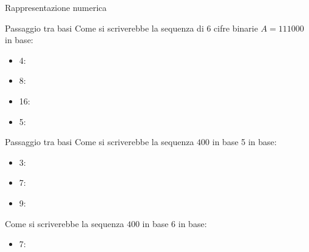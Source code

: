 \documentclass[11pt]{article}
\begin{document}
\begin{quiz}{Rappresentazione numerica}

\begin{cloze}[points=1,shuffle=false]{Passaggio tra basi}
Come si scriverebbe la sequenza di 6 cifre binarie $A = 111000$ in base:

\begin{itemize}
\item 4: 
\item 8: 
\item 16: 
\item 5: 
\end{itemize}
\end{cloze}

\begin{cloze}[points=1,shuffle=false]{Passaggio tra basi}
Come si scriverebbe la sequenza $400$ in base 5 in base:

\begin{itemize}
\item 3: 
\item 7: 
\item 9: 
\end{itemize}

Come si scriverebbe la sequenza $400$ in base 6 in base:

\begin{itemize}
\item 7: 
\end{itemize}
\end{cloze}


\end{quiz}
\end{document}
